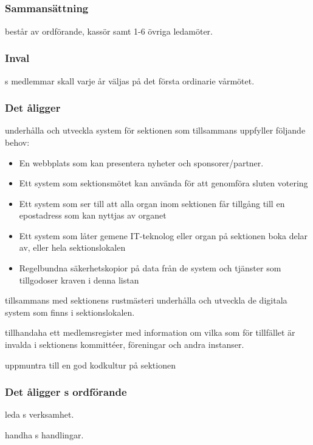\subsection{\DIGITFULL}
\subsubsection{Sammansättning}
\DIGIT{} består av ordförande, kassör samt 1-6 övriga ledamöter.

\subsubsection{Inval}
\DIGIT{}s medlemmar skall varje år väljas på det första ordinarie vårmötet.

\subsubsection{Det åligger \DIGIT}
\begin{att}
	\item underhålla och utveckla system för sektionen som tillsammans uppfyller följande behov:
	\begin{itemize}
		\item En webbplats som kan presentera nyheter och sponsorer/partner.
		\item Ett system som sektionsmötet kan använda för att genomföra sluten votering
		\item Ett system som ser till att alla organ inom sektionen får tillgång till en epostadress som kan nyttjas av organet
		\item Ett system som låter gemene IT-teknolog eller organ på sektionen boka delar av, eller hela sektionslokalen
		\item Regelbundna säkerhetskopior på data från de system och tjänster som tillgodoser kraven i denna listan
	\end{itemize}
	\item tillsammans med sektionens rustmästeri underhålla och utveckla de digitala system som finns i sektionslokalen.
	\item tillhandaha ett medlemsregister med information om vilka som för tillfället är invalda i sektionens kommittéer, föreningar och andra instanser.
	\item uppmuntra till en god kodkultur på sektionen
\end{att}

\subsubsection{Det åligger \DIGIT{}s ordförande}
\begin{att}
	\item leda \DIGIT{}s verksamhet.
	\item handha \DIGIT{}s handlingar.
\end{att}

